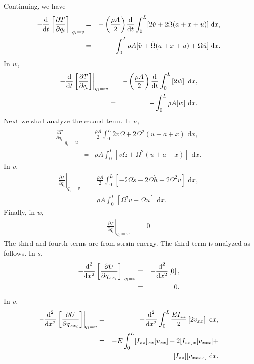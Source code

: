 Continuing, we have
\begin{eqnarray}
\left.-\frac{\text d}{\text dt}\left[\frac{\partial T}{\partial \dot q_i}\right]\right|_{q_i=v}
&=& -\left(\frac{\rho A}{2}\right)\frac{\text d}{\text dt}\int_0^L[2\dot v+2\Omega (a+x+u)]\text{ d}x,\\
&=& -\int_0^L \rho A [\ddot v + \dot \Omega (a+x+u)+\Omega\dot u]\text{ d}x.
\end{eqnarray}
In $w$,
\begin{eqnarray}
\left.-\frac{\text d}{\text dt}\left[\frac{\partial T}{\partial \dot q_i}\right]\right|_{q_i=w}
&=& -\left(\frac{\rho A}{2}\right)\frac{\text d}{\text dt}\int_0^L\left[2\dot w \right]\text{ d}x,\\
&=& -\int_0^L \rho A [\ddot w]\text{ d}x.
\end{eqnarray}
Next we shall analyze the second term. In $u$,
\begin{eqnarray}
\left.\frac{\partial T}{\partial q_i}\right|_{q_i=u} 
&=& \frac{\rho A}{2}\int_0^L 2\dot v\Omega+2\Omega^2(u+a+x)\text{ d}x,\\
&=& \rho A\int_0^L  [\dot v\Omega+\Omega^2(u+a+x)]\text{ d}x.
\end{eqnarray}
In $v$,
\begin{eqnarray}
\left.\frac{\partial T}{\partial q_i}\right|_{q_i=v} 
&=& \frac{\rho A}{2}\int_0^L [-2\Omega\dot s-2\Omega\dot h+2\Omega^2v ]\text{ d}x,\\
&=& \rho A\int_0^L  [\Omega^2v-\Omega\dot u] \text{ d}x.
\end{eqnarray}
Finally, in $w$,
\begin{eqnarray}
\left.\frac{\partial T}{\partial q_i}\right|_{q_i=w} 
&=& 0
\end{eqnarray}
The third and fourth terms are from strain energy. The third term is analyzed as follows. In $s$,
\begin{eqnarray}
\left.-\frac{\text d^2}{\text dx^2}\left[\frac{\partial U}{\partial q_{xx_i}}\right]\right|_{q_i=s} 
&=& -\frac{\text d^2}{\text dx^2}\left[ 0\right],\\
&=& 0.
\end{eqnarray}
In $v$,
\begin{eqnarray}
\left.-\frac{\text d^2}{\text dx^2}\left[\frac{\partial U}{\partial q_{xx_i}}\right]\right|_{q_i=v} 
&=& -\frac{\text d^2}{\text dx^2}\int_0^L\frac{EI_{zz}}{2}\left[ 2v_{xx} \right]\text{ d}x,\\
&=& -E\int_0^L [I_{zz}]_{xx}[v_{xx}]+2[I_{zz}]_{x}[v_{xxx}]+\\
& & \qquad [I_{zz}][v_{xxxx}]\text{ d}x. \nonumber
\end{eqnarray}
